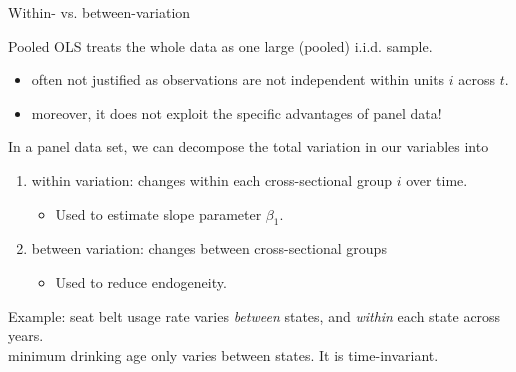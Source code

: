 \documentclass[11pt, aspectratio = 169]{beamer}
\begin{document}
\begin{frame}{Within- vs. between-variation}

Pooled OLS treats the whole data as one large (pooled) i.i.d. sample.
\vspace{-0.23cm}
\begin{itemize}
    \item often not justified as observations are not independent within units $i$ across $t$.
    \item moreover, it does not exploit the specific advantages of panel data!
\end{itemize}
\bigskip
\pause    
In a panel data set, we can decompose the total variation in our variables into

\begin{enumerate}
    \item \alert{within variation:} changes within each cross-sectional group $i$ over time.
    \begin{itemize}
        \item[$\rightarrow$] Used to estimate slope parameter $\beta_1$. 
    \end{itemize}
     \item \alert{between variation:} changes between cross-sectional groups
     \begin{itemize}
        \item[$\rightarrow$] Used to reduce endogeneity. 
    \end{itemize} 
\end{enumerate}

Example: seat belt usage rate varies \textit{between} states, and \textit{within} each state across years. \\
minimum drinking age only varies between states. It is \alert{time-invariant}.
\end{frame}
\end{document}
